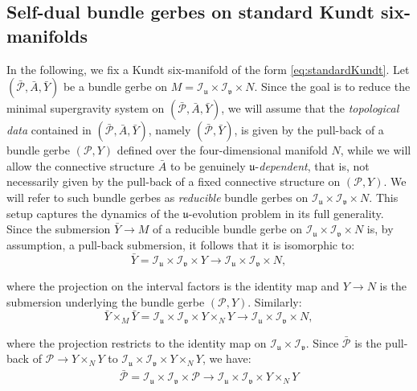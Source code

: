 \documentclass[10pt,a4paper,twoside,reqno]{amsart}
\theoremstyle{plain}
\theoremstyle{definition}
\theoremstyle{remark}
\def\cI{\mathcal{I}}
\def\cP{\mathcal{P}}
\def\cP{\mathcal{P}}
\def\fru{\mathfrak{u}}
\def\frv{\mathfrak{v}}
\begin{document}

\subsection{Self-dual bundle gerbes on standard Kundt six-manifolds}


In the following, we fix a Kundt six-manifold of the form \eqref{eq:standardKundt}. Let $(\bar{\cP} , \bar{A}, \bar{Y})$ be a bundle gerbe on $M = \cI_{\fru}\times \cI_{\frv} \times N$. Since the goal is to reduce the minimal supergravity system on $(\bar{\cP} , \bar{A}, \bar{Y})$, we will assume that the \emph{topological data} contained in $(\bar{\cP} , \bar{A}, \bar{Y})$, namely $(\bar{\cP},\bar{Y})$, is given by the pull-back of a bundle gerbe $(\cP,Y)$ defined over the four-dimensional manifold $N$, while we will allow the connective structure $\bar{A}$ to be genuinely $\fru$-\emph{dependent}, that is, not necessarily given by the pull-back of a fixed connective structure on $(\cP,Y)$. We will refer to such bundle gerbes as \emph{reducible} bundle gerbes on $\cI_{\fru}\times \cI_{\frv} \times N$. This setup captures the dynamics of the $\fru$-evolution problem in its full generality. Since the submersion $\bar{Y} \to M$ of a reducible bundle gerbe on $\cI_{\fru}\times \cI_{\frv} \times N$ is, by assumption, a pull-back submersion, it follows that it is isomorphic to:
\begin{equation*}
\bar{Y} = \cI_{\fru}\times \cI_{\frv} \times Y \to \cI_{\fru}\times \cI_{\frv} \times N,
\end{equation*}

\noindent
where the projection on the interval factors is the identity map and $Y\to N$ is the submersion underlying the bundle gerbe $(\cP , Y)$. Similarly:
\begin{equation*}
\bar{Y}\times_M  \bar{Y} = \cI_{\fru}\times \cI_{\frv}\times Y \times_N Y \to \cI_{\fru}\times \cI_{\frv} \times N,
\end{equation*}

\noindent
where the projection restricts to the identity map on $\cI_{\fru}\times \cI_{\frv}$. Since $\bar{\cP}$ is the pull-back of $\cP\to Y\times_{N} Y$ to $\cI_{\fru}\times \cI_{\frv} \times Y\times_{N} Y$, we have:
\begin{eqnarray*}
\bar{\cP}= \cI_{\fru}\times \cI_{\frv} \times \cP \to \cI_{\fru}\times \cI_{\frv} \times Y\times_{N} Y
\end{eqnarray*}
\end{document}
